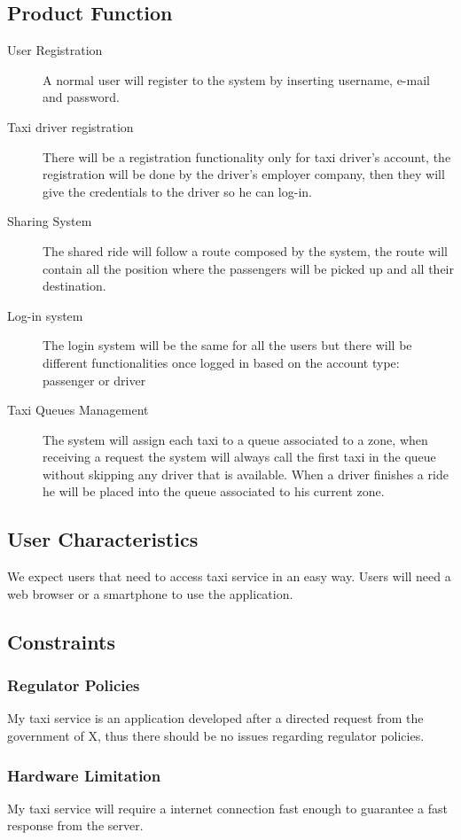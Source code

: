 \subsection{Product Function}
	\begin{description}
		\item [User Registration] A normal user will register to the system by inserting username, e-mail and password.
		\item [Taxi driver registration] There will be a registration functionality only for taxi driver's account, the registration will be done by the driver's employer company, then they will give the credentials to the driver so he can log-in.
		\item [Sharing System] The shared ride will follow a route composed by the system, the route will contain all the position where the passengers will be picked up and all their destination.
		\item [Log-in system] The login system will be the same for all the users but there will be different functionalities once logged in based on the account type: passenger or driver
		\item [Taxi Queues Management] The system will assign each taxi to a queue associated to a zone, when receiving a request the system will always call the first taxi in the queue without skipping any driver that is available. When a driver finishes a ride he will be placed into the queue associated to his current zone.
	\end{description}
\subsection{User Characteristics}
	We expect users that need to access taxi service in an easy way. Users will need a web browser or a smartphone to use the application.	
\subsection{Constraints}
	\subsubsection{Regulator Policies }
		My taxi service is an application developed after a directed request from the government of X, thus there should be no issues regarding regulator policies.
	\subsubsection{Hardware Limitation}
		My taxi service will require a internet connection fast enough to guarantee a fast response from the server.
